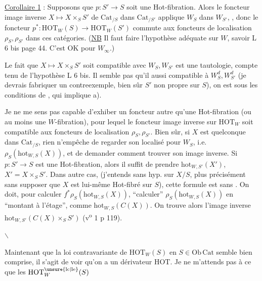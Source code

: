 \uline{Corollaire 1} : Supposons que $p:S'\longrightarrow S$ soit une Hot-fibration. Alors le foncteur image inverse $X\mapsto X\times_S S'$ de $\mathrm{Cat}_{/S}$ dans $\mathrm{Cat}_{/S'}$ applique $W_S$ dans $W_{S'}$, , donc le foncteur $p^*:\mathrm{HOT}_W(S)\longrightarrow\mathrm{HOT}_W(S')$ commute aux foncteurs de localisation $\rho_S,\rho_{S'}$ dans ces catégories. (\uline{NB} Il faut faire l'hypothèse adéquate sur $W$, savoir L 6 bis page 44. C'est OK pour $W_\infty$.)

Le fait que $X\mapsto X\times_S S'$ soit compatible avec $W_S,W_{S'}$ est une tautologie, compte tenu de l'hypothèse L 6 bis. Il  semble pas qu'il   aussi compatible à $W_S^d,W_{S'}^d$ (je devrais fabriquer un contreexemple,  bien sûr $S'$ non propre sur $S$),   on est sous les conditions de , qui implique a).

Je ne me sens pas capable d'exhiber un foncteur autre qu'une Hot-fibration (ou  au moins une $W$-fibration), pour lequel le foncteur image inverse sur $\mathrm{HOT}_W$ soit compatible aux foncteurs de localisation $\rho_S,\rho_{S'}$. Bien sûr, si $X$ est quelconque dans $\mathrm{Cat}_{/S}$, rien n'empêche de regarder son localisé pour $W_S$, i.e. $\rho_S(\mathrm{hot}_{W,S}(X))$, et de  demander comment trouver son image inverse. Si $p:S'\longrightarrow S$ est une Hot-fibration, alors il suffit de prendre $\mathrm{hot}_{W,S'}(X')$, $X'=X\times_S S'$. Dans  autre cas, (j'entends sans hyp. sur $X/S$,  plus précisément sans supposer que $X$ est lui-même Hot-fibré sur $S$), cette formule est  sans . On doit, pour calculer $f^*\rho_S(\mathrm{hot}_{W,S}(X))$, ``calculer'' $\rho_S(\mathrm{hot}_{W,S}(X))$ en ``montant à l'étage'', comme $\mathrm{hot}_{W,S}(C(X))$. On trouve alors l'image inverse $\mathrm{hot}_{W,S'}(C(X)\times_S S')$ (v\textsuperscript{o}  1 p 119).

\centerline{\(\backslash\)}

Maintenant que la loi contravariante de $\mathrm{HOT}_W(S)$ en $S\in\mathrm{Ob}\,\mathrm{Cat}$ semble bien comprise, il s'agit de voir qu'on a  un dérivateur $\mathrm{HOT}$. Je ne m'attends pas à ce que les $\mathrm{HOT}^{\unsure{\mathrm{lc}|\mathrm{le}}}_W(S)$

